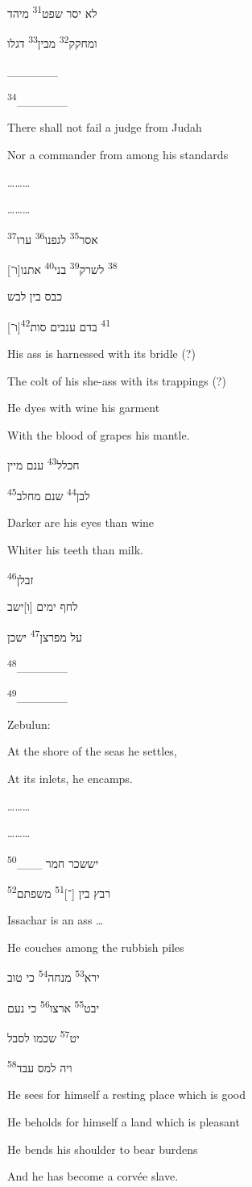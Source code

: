 {
	לא יסר שפט\textsuperscript{31} מיהד

	ומחקק\textsuperscript{32} מבין\textsuperscript{33} דגלו

	\_\_\_\_\_\_

	\textsuperscript{34}\_\_\_\_\_\_
}
{
	There shall not fail a judge from Judah

	Nor a commander from
	among his standards

	\ldots\ldots\ldots

	\ldots\ldots\ldots
}
{
}

{
	אסר\textsuperscript{35} לגפנו\textsuperscript{36} ערו\textsuperscript{37}

	[ו־]\textsuperscript{38} לשרק\textsuperscript{39} בני\textsuperscript{40} אתנו

	כבס בין לבש

	[ו־]\textsuperscript{41} בדם ענבים סות\textsuperscript{42}
}
{
	His ass is harnessed with its bridle (?)

	The colt of his she-ass with its trappings (?)

	He dyes with wine his garment

	With the blood of grapes his mantle.
}
{
}

{
	חכלל\textsuperscript{43} ענם מיין

	לבן\textsuperscript{44} שנם מחלב\textsuperscript{45}
}
{
	Darker are his eyes than wine

	Whiter his teeth than milk.
}
{
}

{
	זבלן\textsuperscript{46}

	לחף ימים [ו]ישב

	על מפרצן\textsuperscript{47} ישכן

	\textsuperscript{48}\_\_\_\_\_\_

	\textsuperscript{49}\_\_\_\_\_\_
}
{
	Zebulun:

	At the shore of the seas he settles,

	At its inlets, he encamps.

	\ldots\ldots\ldots

	\ldots\ldots\ldots
}
{
}

{
	יששכר חמר \_\_\_\textsuperscript{50}

	רבץ בין [־]\textsuperscript{51} משפתם\textsuperscript{52}
}
{
	Issachar is an ass \ldots

	He couches among the rubbish piles
}
{
}

{
	ירא\textsuperscript{53} מנחה\textsuperscript{54} כי טוב

	יבט\textsuperscript{55} ארצו\textsuperscript{56} כי נעם

	יט\textsuperscript{57} שכמו לסבל

	ויה למס עבד\textsuperscript{58}
}
{
	He sees for himself a resting place
	which is good

	He beholds for himself a land
	which is pleasant

	He bends his shoulder to bear burdens

	And he has become a corvée slave.
}
{
}

